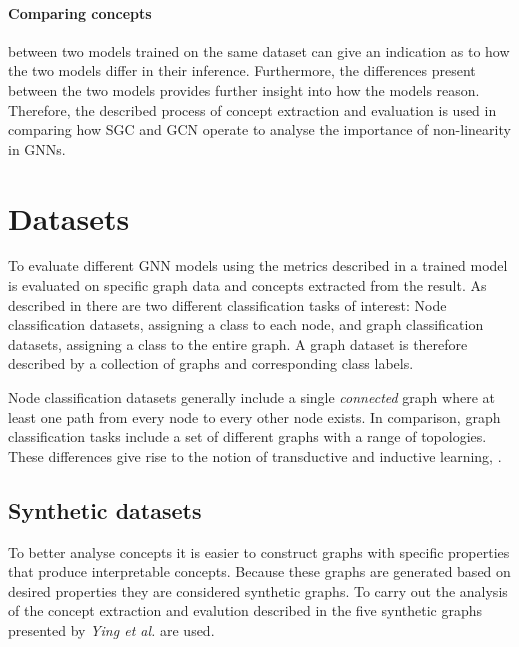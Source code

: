 \paragraph{Comparing concepts} between two models trained on the same dataset can give an indication as to how the two models differ in their inference.
Furthermore, the differences present between the two models provides further insight into how the models reason.
Therefore, the described process of concept extraction and evaluation is used in comparing how SGC and GCN operate to analyse the importance of non-linearity in GNNs.  

\section{Datasets}
\label{sec:datasets-theory}


To evaluate different GNN models using the metrics described in  a trained model is evaluated on specific graph data and concepts extracted from the result.
As described in  there are two different classification tasks of interest:
Node classification datasets, assigning a class to each node, and graph classification datasets, assigning a class to the entire graph.
A graph dataset is therefore described by a collection of graphs and corresponding class labels.

Node classification datasets generally include a single \emph{connected} graph where at least one path from every node to every other node exists.
In comparison, graph classification tasks include a set of different graphs with a range of topologies.
These differences give rise to the notion of transductive and inductive learning, .

\subsection{Synthetic datasets}
\label{sec:synth}


To better analyse concepts it is easier to construct graphs with specific properties that produce interpretable concepts.
Because these graphs are generated based on desired properties they are considered synthetic graphs.
To carry out the analysis of the concept extraction and evalution described in  the five synthetic graphs presented by \textit{Ying et al.}\cite{ying2019gnnexplainer} are used.


